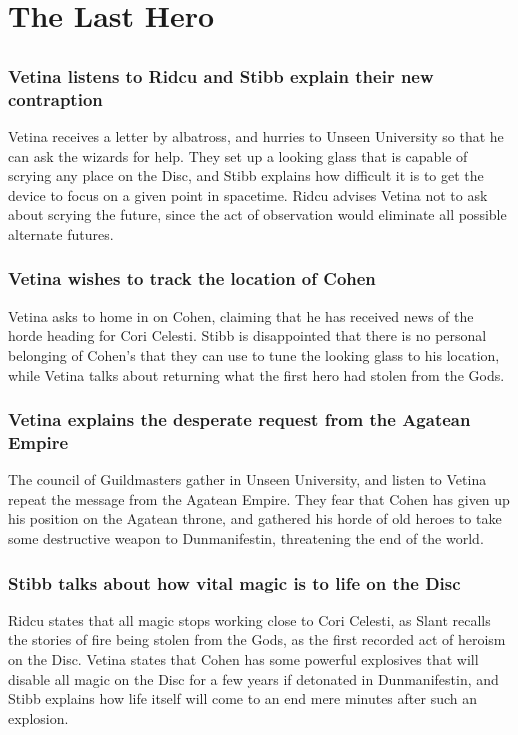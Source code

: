 \section{The Last Hero}


\subsection{}
\subsubsection{\Gls{Vetina} listens to \Gls{Ridcu} and \Gls{Stibb} explain their new contraption}
\Gls{Vetina} receives a letter by albatross, and hurries to Unseen University so that he can ask
the wizards for help. They set up a looking glass that is capable of scrying any place on the Disc,
and \Gls{Stibb} explains how difficult it is to get the device to focus on a given point in
spacetime. \Gls{Ridcu} advises \Gls{Vetina} not to ask about scrying the future, since the act of
observation would eliminate all possible alternate futures.

\subsubsection{\Gls{Vetina} wishes to track the location of \Gls{Cohen}}
\Gls{Vetina} asks to home in on \Gls{Cohen}, claiming that he has received news of the horde
heading for Cori Celesti. \Gls{Stibb} is disappointed that there is no personal belonging of
\Gls{Cohen}'s that they can use to tune the looking glass to his location, while \Gls{Vetina} talks
about returning what the first hero had stolen from the Gods.

\subsubsection{\Gls{Vetina} explains the desperate request from the Agatean Empire}
The council of Guildmasters gather in Unseen University, and listen to \Gls{Vetina} repeat the
message from the Agatean Empire. They fear that \Gls{Cohen} has given up his position on the
Agatean throne, and gathered his horde of old heroes to take some destructive weapon to
Dunmanifestin, threatening the end of the world.

\subsubsection{\Gls{Stibb} talks about how vital magic is to life on the Disc}
\Gls{Ridcu} states that all magic stops working close to Cori Celesti, as \Gls{Slant} recalls the
stories of fire being stolen from the Gods, as the first recorded act of heroism on the Disc.
\Gls{Vetina} states that \Gls{Cohen} has some powerful explosives that will disable all magic on
the Disc for a few years if detonated in Dunmanifestin, and \Gls{Stibb} explains how life itself
will come to an end mere minutes after such an explosion.

